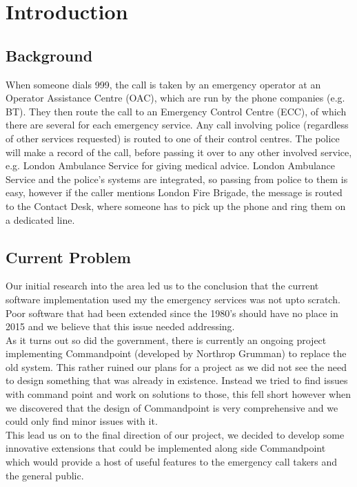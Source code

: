 \documentclass{article}
\begin{document}
\pagebreak
    \section{Introduction}
    \subsection{Background}
    When someone dials 999, the call is taken by an emergency operator at an Operator Assistance Centre (OAC), which are run by the phone companies (e.g. BT). They then route the call to an Emergency Control Centre (ECC), of which there are several for each emergency service. Any call involving police (regardless of other services requested) is routed to one of their control centres. The police will make a record of the call, before passing it over to any other involved service, e.g. London Ambulance Service for giving medical advice. London Ambulance Service and the police’s systems are integrated, so passing from police to them is easy, however if the caller mentions London Fire Brigade, the message is routed to the Contact Desk, where someone has to pick up the phone and ring them on a dedicated line.

    \subsection{Current Problem}
    Our initial research into the area led us to the conclusion that the current software implementation used my the emergency services was not upto scratch. Poor software that had been extended since the 1980's should have no place in 2015 and we believe that this issue needed addressing.\\
    
    As it turns out so did the government, there is currently an ongoing project implementing Commandpoint (developed by Northrop Grumman) to replace the old system. This rather ruined our plans for a project as we did not see the need to design something that was already in existence. Instead we tried to find issues with command point and work on solutions to those, this fell short however when we discovered that the design of Commandpoint is very comprehensive and we could only find minor issues with it.\\
    
    This lead us on to the final direction of our project, we decided to develop some innovative extensions that could be implemented along side Commandpoint which would provide a host of useful features to the emergency call takers and the general public. 
    
\end{document}
